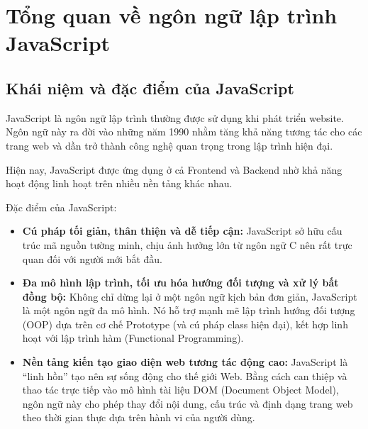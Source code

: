 \documentclass[../main.tex]{subfiles}
\begin{document}
\section{Tổng quan về ngôn ngữ lập trình JavaScript}

\subsection{Khái niệm và đặc điểm của JavaScript}

JavaScript là ngôn ngữ lập trình thường được sử dụng khi phát triển website. Ngôn ngữ này ra đời vào những năm 1990 nhằm tăng khả năng tương tác cho các trang web và dần trở thành công nghệ quan trọng trong lập trình hiện đại.

Hiện nay, JavaScript được ứng dụng ở cả Frontend và Backend nhờ khả năng hoạt động linh hoạt trên nhiều nền tảng khác nhau.

Đặc điểm của JavaScript:
\begin{itemize}
    \item \textbf{Cú pháp tối giản, thân thiện và dễ tiếp cận:} JavaScript sở hữu cấu trúc mã nguồn tường minh, chịu ảnh hưởng lớn từ ngôn ngữ C nên rất trực quan đối với người mới bắt đầu.
    \item \textbf{Đa mô hình lập trình, tối ưu hóa hướng đối tượng và xử lý bất đồng bộ:} Không chỉ dừng lại ở một ngôn ngữ kịch bản đơn giản, JavaScript là một ngôn ngữ đa mô hình. Nó hỗ trợ mạnh mẽ lập trình hướng đối tượng (OOP) dựa trên cơ chế Prototype (và cú pháp class hiện đại), kết hợp linh hoạt với lập trình hàm (Functional Programming).
    \item \textbf{Nền tảng kiến tạo giao diện web tương tác động cao:} JavaScript là ``linh hồn'' tạo nên sự sống động cho thế giới Web. Bằng cách can thiệp và thao tác trực tiếp vào mô hình tài liệu DOM (Document Object Model), ngôn ngữ này cho phép thay đổi nội dung, cấu trúc và định dạng trang web theo thời gian thực dựa trên hành vi của người dùng.
\end{itemize}
\end{document}
